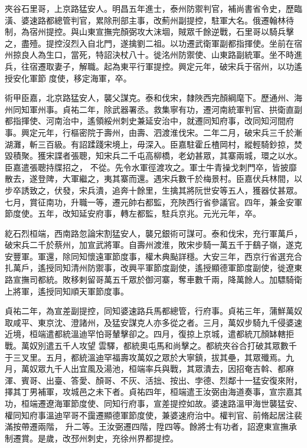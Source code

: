 \begin{pinyinscope}
 夾谷石里哥，上京路猛安人。明昌五年進士，泰州防禦判官，補尚書省令史，歷臨潢、婆速路都總管判官，累除刑部主事，改薊州副提控，駐軍大名。俄遷翰林待制，為宿州提控。與山東宣撫完顏弼攻大沫堌，賊眾千餘逆戰，石里哥以騎兵擊之，盡殪。提控沒烈入自北門，遂擒劉二祖。以功遷武衛軍副都指揮使。坐前在宿州掠良人為生口，當死，特詔決杖八十。徙洺州防禦使、山東路副統軍。坐不時進兵，往宿遷取妻子，解職。起為東平行軍提控。興定元年，破宋兵于宿州，以功遙授安化軍節
 度使，移定海軍，卒。



 術甲臣嘉，北京路猛安人，襲父謀克。泰和伐宋，隸陜西完顏綱麾下。歷通州、海州同知軍州事。貞祐二年，除武器署丞。救集寧有功，遷河南統軍判官、拱衛直副都指揮使、河南治中，遙領綏州刺史兼延安治中，就遷同知府事，改同知河間府事。興定元年，行樞密院于壽州，由壽、泗渡淮伐宋。二年二月，破宋兵三千於漸湖灘，斬三百級。有詔蹂踐宋境上，毋深入。臣嘉駐霍丘楂岡村，縱輕騎鈔掠，焚毀積聚。獲宋諜者張聰，知宋兵二千屯高柳橋，老幼甚眾，其寨兩城，環之以水。臣嘉遣張聰持牒招之，
 不從。先令水軍徑渡攻之。軍士牛青操戈刺門卒，皆披靡散去，遂登陴，大軍繼之，夷其寨而還。遇宋兵數千於梅景村。臣嘉伏兵林間，以步卒誘致之，伏發，宋兵潰，追奔十餘里，生擒其將阮世安等五人，獲器仗甚眾。七月，賞征南功，升職一等，遷元帥右都監，充陜西行省參議官。四年，兼金安軍節度使。五年，改知延安府事，轉左都監，駐兵京兆。元光元年，卒。



 紇石烈桓端，西南路忽論宋割猛安人，襲兄銀術可謀可。泰和伐宋，充行軍萬戶，破宋兵二千於蔡州，加宣武將軍。自壽州渡淮，敗宋步騎一萬五千于鷂子嶺，遂克
 安豐軍。軍還，除同知懷遠軍節度事，權木典颭詳穩。大安三年，西京行省選充合扎萬戶，遙授同知清州防禦事，改興平軍節度副使，遙授顯德軍節度副使，徙遼東路宣撫司都統。敗移剌留哥萬五千眾於御河寨，奪車數千兩，降萬餘人。加驃騎衛上將軍，遙授同知順天軍節度事。



 貞祐二年，為宣差副提控，同知婆速路兵馬都總管，行府事。貞祐三年，蒲鮮萬奴取咸平、東京沈、澄諸州，及猛安謀克人亦多從之者。三月，萬奴步騎九千侵婆速近境，桓端遣都統溫迪罕怕哥輦擊卻之。四月，復掠上京城，遣都統兀顏缽轄拒戰。萬奴別遣五千人攻望
 雲驛，都統奧屯馬和尚擊之。都統夾谷合打破其眾數千于三叉里。五月，都統溫迪罕福壽攻萬奴之眾於大寧鎮，拔其壘，其眾殲焉。九月，萬奴眾九千人出宜風及湯池，桓端率兵與戰，其眾潰去，因招奄吉斡、都麻渾、賓哥、出臺、答愛、顏哥、不灰、活拙、按出、孛德、烈鄰十一猛安復來附，擇其丁男補軍，攻城邑之未下者。貞祐四年，桓端遣王汝弼由海道奏事，宣宗嘉其功，桓端遷遼海軍節度使、同知行府事，宣差提控如故。婆速路溫甲海世襲猛安、權同知府事溫迪罕哥不靄遷顯德軍節度使，兼婆速府治中。權判官、前脩起居注裴滿按帶遷兩階，
 升二等。王汝弼遷四階，陞四等。餘將士有功者，詔遼東宣撫承制遷賞。是歲，改邳州刺史，充徐州界都提控。




\end{pinyinscope}
